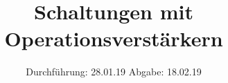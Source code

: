 

\subject{V 51}
\title{Schaltungen mit Operationsverstärkern}
\date{
  Durchführung: 28.01.19
  \hspace{3em}
  Abgabe: 18.02.19
}



\maketitle
\thispagestyle{empty}
\tableofcontents
\newpage
\listoftodos





\printbibliography





